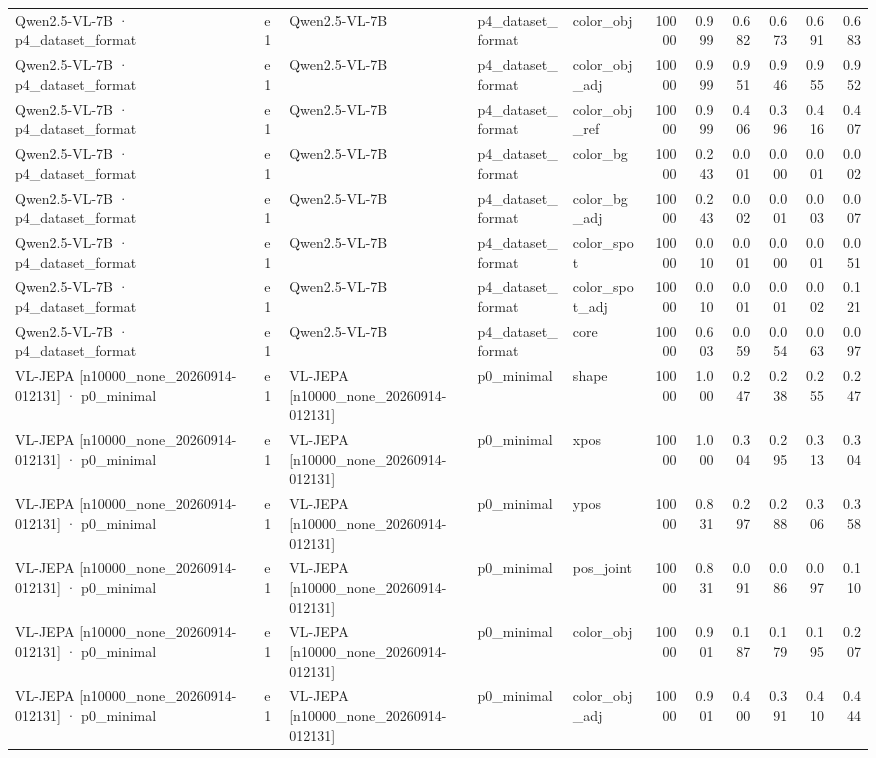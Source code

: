 \begin{tabular}{lllllrrrrrr}
Qwen2.5-VL-7B · p4\_dataset\_format & e1 & Qwen2.5-VL-7B & p4\_dataset\_format & color\_obj & 10000 & 0.999 & 0.682 & 0.673 & 0.691 & 0.683 \\
Qwen2.5-VL-7B · p4\_dataset\_format & e1 & Qwen2.5-VL-7B & p4\_dataset\_format & color\_obj\_adj & 10000 & 0.999 & 0.951 & 0.946 & 0.955 & 0.952 \\
Qwen2.5-VL-7B · p4\_dataset\_format & e1 & Qwen2.5-VL-7B & p4\_dataset\_format & color\_obj\_ref & 10000 & 0.999 & 0.406 & 0.396 & 0.416 & 0.407 \\
Qwen2.5-VL-7B · p4\_dataset\_format & e1 & Qwen2.5-VL-7B & p4\_dataset\_format & color\_bg & 10000 & 0.243 & 0.001 & 0.000 & 0.001 & 0.002 \\
Qwen2.5-VL-7B · p4\_dataset\_format & e1 & Qwen2.5-VL-7B & p4\_dataset\_format & color\_bg\_adj & 10000 & 0.243 & 0.002 & 0.001 & 0.003 & 0.007 \\
Qwen2.5-VL-7B · p4\_dataset\_format & e1 & Qwen2.5-VL-7B & p4\_dataset\_format & color\_spot & 10000 & 0.010 & 0.001 & 0.000 & 0.001 & 0.051 \\
Qwen2.5-VL-7B · p4\_dataset\_format & e1 & Qwen2.5-VL-7B & p4\_dataset\_format & color\_spot\_adj & 10000 & 0.010 & 0.001 & 0.001 & 0.002 & 0.121 \\
Qwen2.5-VL-7B · p4\_dataset\_format & e1 & Qwen2.5-VL-7B & p4\_dataset\_format & core & 10000 & 0.603 & 0.059 & 0.054 & 0.063 & 0.097 \\
VL-JEPA [n10000\_none\_20260914-012131] · p0\_minimal & e1 & VL-JEPA [n10000\_none\_20260914-012131] & p0\_minimal & shape & 10000 & 1.000 & 0.247 & 0.238 & 0.255 & 0.247 \\
VL-JEPA [n10000\_none\_20260914-012131] · p0\_minimal & e1 & VL-JEPA [n10000\_none\_20260914-012131] & p0\_minimal & xpos & 10000 & 1.000 & 0.304 & 0.295 & 0.313 & 0.304 \\
VL-JEPA [n10000\_none\_20260914-012131] · p0\_minimal & e1 & VL-JEPA [n10000\_none\_20260914-012131] & p0\_minimal & ypos & 10000 & 0.831 & 0.297 & 0.288 & 0.306 & 0.358 \\
VL-JEPA [n10000\_none\_20260914-012131] · p0\_minimal & e1 & VL-JEPA [n10000\_none\_20260914-012131] & p0\_minimal & pos\_joint & 10000 & 0.831 & 0.091 & 0.086 & 0.097 & 0.110 \\
VL-JEPA [n10000\_none\_20260914-012131] · p0\_minimal & e1 & VL-JEPA [n10000\_none\_20260914-012131] & p0\_minimal & color\_obj & 10000 & 0.901 & 0.187 & 0.179 & 0.195 & 0.207 \\
VL-JEPA [n10000\_none\_20260914-012131] · p0\_minimal & e1 & VL-JEPA [n10000\_none\_20260914-012131] & p0\_minimal & color\_obj\_adj & 10000 & 0.901 & 0.400 & 0.391 & 0.410 & 0.444 \\

\end{tabular}
